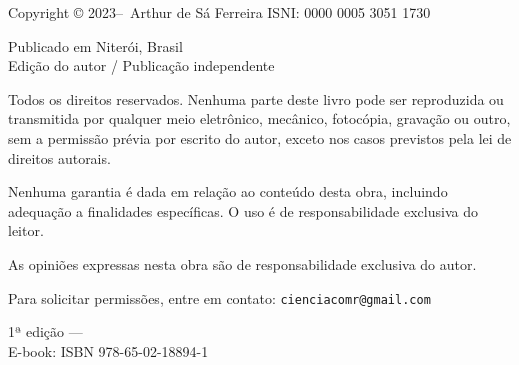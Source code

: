   \begin{center}
    \small
    Copyright © 2023--\the\year\ Arthur de Sá Ferreira ISNI: 0000 0005 3051 1730

    \vspace{1em}

    Publicado em Niterói, Brasil \\
    Edição do autor / Publicação independente

    \vspace{1em}

    Todos os direitos reservados. Nenhuma parte deste livro pode ser reproduzida
    ou transmitida por qualquer meio eletrônico, mecânico, fotocópia, gravação
    ou outro, sem a permissão prévia por escrito do autor, exceto nos casos
    previstos pela lei de direitos autorais.

    \vspace{1em}

    Nenhuma garantia é dada em relação ao conteúdo desta obra, incluindo
    adequação a finalidades específicas. O uso é de responsabilidade
    exclusiva do leitor.

    \vspace{1em}

    As opiniões expressas nesta obra são de responsabilidade exclusiva do autor.

    \vspace{1em}

    Para solicitar permissões, entre em contato: \texttt{cienciacomr@gmail.com}

    \vspace{2em}

    1ª edição — \the\year \\
    E-book: ISBN 978-65-02-18894-1
  \end{center}

\newpage
